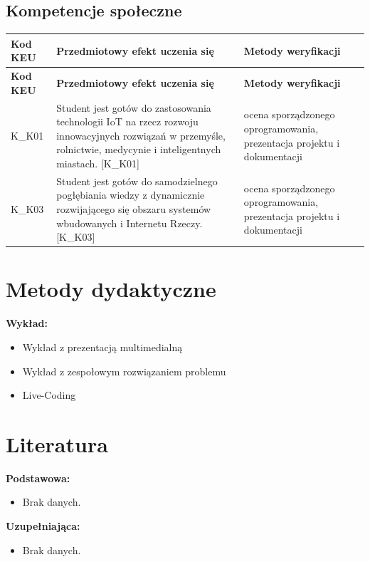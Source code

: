 \documentclass[12pt, a4paper]{article}
\newcommand{\thdrule}{\noalign{\global\setlength{\extrarowheight}{0pt}}}
\newcommand{\thdend}{\noalign{\global\setlength{\extrarowheight}{3pt}}}
\begin{document}
\subsection*{Kompetencje społeczne}
{\scriptsize
\begin{longtable}{m{1.6cm}m{9.0cm}m{4.2cm}}
\thdrule\toprule
\rowcolor{pjatkRed} {\color{white}\footnotesize\textbf{\vphantom{Ag}Kod KEU}} & {\color{white}\footnotesize\textbf{\vphantom{Ag}Przedmiotowy efekt uczenia się}} & {\color{white}\footnotesize\textbf{\vphantom{Ag}Metody weryfikacji}} \\
\midrule\thdend
\endfirsthead
\thdrule\toprule
\rowcolor{pjatkRed} {\color{white}\footnotesize\textbf{\vphantom{Ag}Kod KEU}} & {\color{white}\footnotesize\textbf{\vphantom{Ag}Przedmiotowy efekt uczenia się}} & {\color{white}\footnotesize\textbf{\vphantom{Ag}Metody weryfikacji}} \\
\midrule\thdend
\endhead
  \rowcolor{tableRowLight} K\_K01 & Student jest gotów do zastosowania technologii IoT na rzecz rozwoju innowacyjnych rozwiązań w przemyśle, rolnictwie, medycynie i inteligentnych miastach. {[}K\_K01{]} & ocena sporządzonego oprogramowania, prezentacja projektu i dokumentacji \\
  \rowcolor{tableRowAlt} K\_K03 & Student jest gotów do samodzielnego pogłębiania wiedzy z dynamicznie rozwijającego się obszaru systemów wbudowanych i Internetu Rzeczy. {[}K\_K03{]} & ocena sporządzonego oprogramowania, prezentacja projektu i dokumentacji \\
\bottomrule
\end{longtable}}

\section{Metody dydaktyczne}

\textbf{Wykład:}
\begin{itemize}
  \item Wykład z prezentacją multimedialną
  \item Wykład z zespołowym rozwiązaniem problemu
  \item Live-Coding
\end{itemize}
\vspace{4pt}


\section{Literatura}

\textbf{Podstawowa:}
\begin{itemize}
  \item Brak danych.
\end{itemize}

\textbf{Uzupełniająca:}
\begin{itemize}
  \item Brak danych.
\end{itemize}
\end{document}
